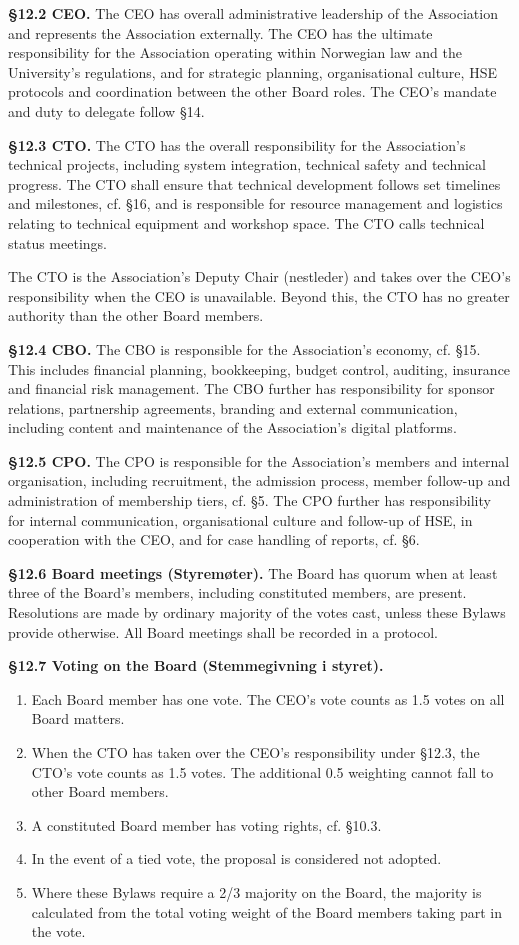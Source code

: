 \documentclass{../../../Common/Latex/Templates/rapport}
\begin{document}
\textbf{\S 12.2 CEO.} The CEO has overall administrative leadership of the Association and represents the Association externally. The CEO has the ultimate responsibility for the Association operating within Norwegian law and the University's regulations, and for strategic planning, organisational culture, HSE protocols and coordination between the other Board roles. The CEO's mandate and duty to delegate follow \S14.

\textbf{\S 12.3 CTO.} The CTO has the overall responsibility for the Association's technical projects, including system integration, technical safety and technical progress. The CTO shall ensure that technical development follows set timelines and milestones, cf. \S16, and is responsible for resource management and logistics relating to technical equipment and workshop space. The CTO calls technical status meetings.

The CTO is the Association's Deputy Chair (nestleder) and takes over the CEO's responsibility when the CEO is unavailable. Beyond this, the CTO has no greater authority than the other Board members.

\textbf{\S 12.4 CBO.} The CBO is responsible for the Association's economy, cf. \S15. This includes financial planning, bookkeeping, budget control, auditing, insurance and financial risk management. The CBO further has responsibility for sponsor relations, partnership agreements, branding and external communication, including content and maintenance of the Association's digital platforms.

\textbf{\S 12.5 CPO.} The CPO is responsible for the Association's members and internal organisation, including recruitment, the admission process, member follow-up and administration of membership tiers, cf. \S5. The CPO further has responsibility for internal communication, organisational culture and follow-up of HSE, in cooperation with the CEO, and for case handling of reports, cf. \S6.

\textbf{\S 12.6 Board meetings (Styremøter).} The Board has quorum when at least three of the Board's members, including constituted members, are present. Resolutions are made by ordinary majority of the votes cast, unless these Bylaws provide otherwise. All Board meetings shall be recorded in a protocol.

\textbf{\S 12.7 Voting on the Board (Stemmegivning i styret).}
\begin{enumerate}
  \item Each Board member has one vote. The CEO's vote counts as 1.5 votes on all Board matters.
  \item When the CTO has taken over the CEO's responsibility under \S12.3, the CTO's vote counts as 1.5 votes. The additional 0.5 weighting cannot fall to other Board members.
  \item A constituted Board member has voting rights, cf. \S10.3.
  \item In the event of a tied vote, the proposal is considered not adopted.
  \item Where these Bylaws require a 2/3 majority on the Board, the majority is calculated from the total voting weight of the Board members taking part in the vote.
\end{enumerate}
\end{document}
